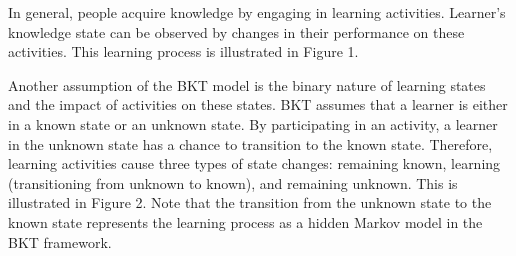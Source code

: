 \documentclass{article}
\begin{document}
In general, people acquire knowledge by engaging in learning activities. Learner's knowledge state can be observed by changes in their performance on these activities. This learning process is illustrated in Figure 1.

\begin{center}
\end{center}

Another assumption of the BKT model is the binary nature of learning states and the impact of activities on these states. BKT assumes that a learner is either in a known state or an unknown state. By participating in an activity, a learner in the unknown state has a chance to transition to the known state. Therefore, learning activities cause three types of state changes: remaining known, learning (transitioning from unknown to known), and remaining unknown. This is illustrated in Figure 2. Note that the transition from the unknown state to the known state represents the learning process as a hidden Markov model in the BKT framework.
\end{document}
